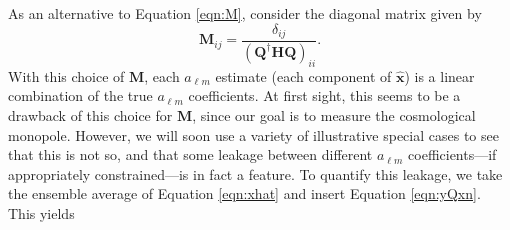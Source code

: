 \documentclass[twolcolumn,apj,iop,numberedappendix]{emulateapj}
\newcommand{\y}{\mathbf{y}}
\newcommand{\N}{\mathbf{N}}
\newcommand{\Hmat}{\mathbf{H}}
\newcommand{\Q}{\mathbf{Q}}
\newcommand{\M}{\mathbf{M}}
\begin{document}
As an alternative to Equation \eqref{eqn:M}, consider the diagonal matrix given by 
\begin{equation}
\label{eq:diagM}
\M_{ij} = \frac{\delta_{ij}}{(\Q^\dagger \Hmat \Q)_{ii}}.
\end{equation}
With this choice of $\M$, each $a_{\ell m}$ estimate (each component of $\hat{\mathbf{x}}$) is a linear combination of the true $a_{\ell m}$ coefficients. At first sight, this seems to be a drawback of this choice for $\M$, since our goal is to measure the cosmological monopole. However, we will soon use a variety of illustrative special cases to see that this is not so, and that some leakage between different $a_{\ell m}$ coefficients---if appropriately constrained---is in fact a feature. To quantify this leakage, we take the ensemble average of Equation \eqref{eqn:xhat} and insert Equation \eqref{eqn:yQxn}. This yields
%
%
%
\end{document}
